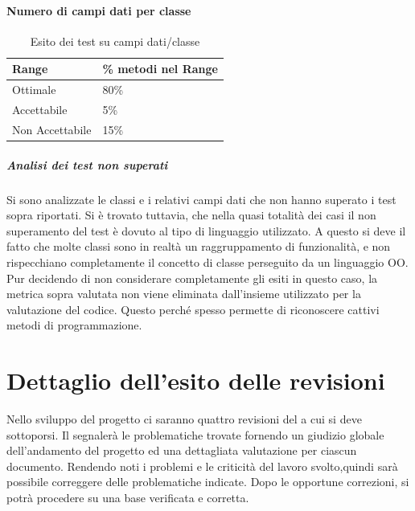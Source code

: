\documentclass[12pt,a4paper]{article}
\begin{document}
\paragraph{Numero di campi dati per classe}
\begin{table}[H]
	\begin{center}
		\begin{tabular}{p{} p{} }
			\toprule
			\textbf{Range}   & \textbf{\% metodi nel Range}	\\ \midrule
			\midrule
			Ottimale & 80\% \\ \midrule
			Accettabile & 5\%  \\ \midrule
			Non Accettabile  & 15\%  \\ \midrule
			\bottomrule
		\end{tabular}
	\end{center}
	\caption{Esito dei test su campi dati/classe}
\end{table}

\subparagraph{Analisi dei test non superati} 
Si sono analizzate le classi e i relativi campi dati che non hanno superato i test sopra riportati. Si è trovato tuttavia, che nella quasi totalità dei casi il non superamento del test è dovuto al tipo di linguaggio utilizzato. A questo si deve il fatto che molte classi sono in realtà un raggruppamento di funzionalità, e non rispecchiano completamente il concetto di classe perseguito da un linguaggio OO. Pur decidendo di non considerare completamente gli esiti in questo caso, la metrica sopra valutata non viene eliminata dall'insieme utilizzato per la valutazione del codice. 
Questo perché spesso permette di riconoscere cattivi metodi di programmazione.

\section{Dettaglio dell'esito delle revisioni}
Nello sviluppo del progetto ci saranno quattro revisioni del  a cui si deve sottoporsi. Il  segnalerà le problematiche trovate fornendo un giudizio globale dell'andamento del progetto ed una dettagliata valutazione per ciascun documento. Rendendo noti i problemi e le criticità del lavoro svolto,quindi sarà possibile correggere delle problematiche indicate. Dopo le opportune correzioni, si potrà procedere su una base verificata e corretta.
\end{document}
